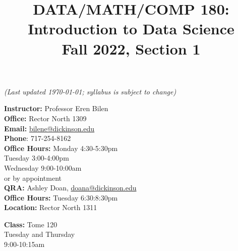 \documentclass[11pt,letter]{article}
\title{{\sffamily\large\textbf{DATA/MATH/COMP 180: Introduction to Data Science}\\ \ttfamily Fall 2022, Section 1}}
\author{}
\date{}
\begin{document}
\faketableofcontents


\maketitle

\vspace{-10em}


\textit{(Last updated \today{}; syllabus is subject to change)}



\begin{minipage}[t]{0.61\linewidth}
\textbf{Instructor:} Professor Eren Bilen\\
\textbf{Office:} Rector North 1309\\
\textbf{Email:} \href{bilene@dickinson.edu}{\url{bilene@dickinson.edu}} \\
\textbf{Phone}: 717-254-8162\\
\textbf{Office Hours:} Monday 4:30-5:30pm \\ \hspace*{6.5em}Tuesday 3:00-4:00pm \\ \hspace*{6.5em}Wednesday 9:00-10:00am \\ \hspace*{5.8em} or by appointment \\
\textbf{QRA:} Ashley Doan, \href{phaml@dickinson.edu}{\url{doana@dickinson.edu}}\\
\textbf{Office Hours:} Tuesday 6:30:8:30pm\\ \textbf{Location:} Rector North 1311 \\
\end{minipage}
\begin{minipage}[t]{0.4\linewidth}
\textbf{Class:} Tome 120\\\hspace*{3.5em}Tuesday and Thursday \\\hspace*{3.5em}9:00-10:15am  \\
\hspace{1em}\\
\hspace{1em}\\
\end{minipage}
\end{document}
